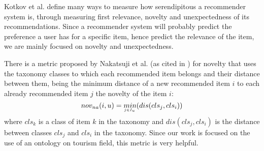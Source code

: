 Kotkov et al. \cite{kotkov2016survey} define many ways to measure how serendipitous a recommender system is, through measuring first relevance, novelty and unexpectedness of its recommendations. Since a recommender system will probably predict the preference a user has for a specific item, hence predict the relevance of the item, we are mainly focused on novelty and unexpectedness.

There is a metric proposed by Nakatsuji et al. (as cited in \cite{kotkov2016survey}) for novelty that uses the taxonomy classes to which each recommended item belongs and their distance between them, being the minimum distance of a new recommended item $i$ to each already recommended item $j$ the novelty of the item $i$:
\begin{equation}
    nov_{na}(i, u) = \underaccent{j \in I_u}{min}(dis(cls_j, cls_i))
\end{equation}
where $cls_k$ is a class of item $k$ in the taxonomy and $dis(cls_j, cls_i)$ is the distance between classes $cls_j$ and $cls_i$ in the taxonomy. Since our work is focused on the use of an ontology on tourism field, this metric is very helpful.

